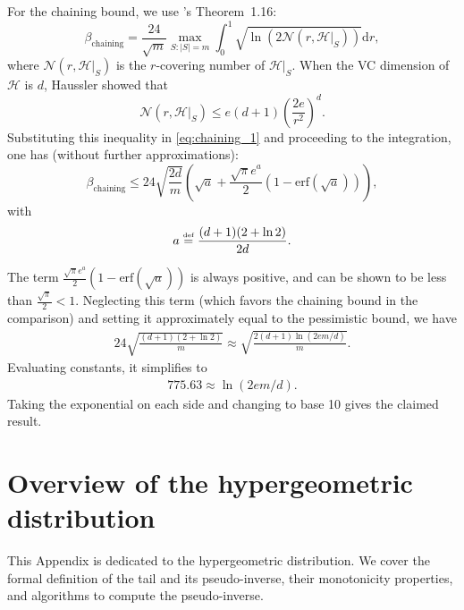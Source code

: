 \documentclass[twoside,11pt]{article}
\newcommand{\pr}[1]{\left(#1\right)}
\renewcommand{\H}{{\mathcal{H}}}
\newcommand{\N}{\mathcal{N}}
\newcommand{\eqdef}{\overset{\smash{\mbox{\tiny \rm def}}}{=}}
\begin{document}
For the chaining bound, we use \citeauthor{lugosi2002pattern}'s Theorem~1.16:
\begin{equation}\label{eq:chaining_1}
    \beta_{\text{chaining}} = \frac{24}{\sqrt{m}} \max_{S:|S|=m} \int_0^1\!\! \sqrt{\ln \pr{ 2 \N(r, \H|_S)}} \textrm{d}r,
\end{equation}
where $\N(r, \H|_S)$ is the $r$-covering number of $\H|_S$.
When the VC dimension of $\H$ is $d$, Haussler showed that
\begin{equation*}
    \N(r, \H|_S) \le e (d+1) \pr{\frac{2e}{r^2}}^d.
\end{equation*}
Substituting this inequality in \eqref{eq:chaining_1} and proceeding to the integration, one has (without further approximations):
\begin{equation*}
    \beta_{\text{chaining}} \le 24\sqrt{\frac{2d}{m}} \pr{ \sqrt{a} + \frac{\sqrt{\pi} e^a}{2} (1- \text{erf}(\sqrt{a})) },
\end{equation*}
with
\begin{equation*}
    a \eqdef \frac{(d+1)(2+\ln2)}{2d}.
\end{equation*}

The term $\frac{\sqrt{\pi} e^a}{2} (1- \text{erf}(\sqrt{a}))$ is always positive, and can be shown to be less than $\frac{\sqrt{\pi}}{2} < 1$.
Neglecting this term (which favors the chaining bound in the comparison) and setting it approximately equal to the pessimistic bound, we have
\begin{align*}
    24 \sqrt{\frac{(d+1)(2+\ln 2)}{m}} \approx \sqrt{\frac{2(d+1)\ln(2em/d)}{m}}.
\end{align*}
Evaluating constants, it simplifies to
\begin{align*}
    775.63 \approx \ln(2em/d).
\end{align*}
Taking the exponential on each side and changing to base 10 gives the claimed result.




\newpage


\section{Overview of the hypergeometric distribution}
\label{app:hypergeometric_distribution}

This Appendix is dedicated to the hypergeometric distribution.
We cover the formal definition of the tail and its pseudo-inverse, their monotonicity properties, and algorithms to compute the pseudo-inverse.
\end{document}
